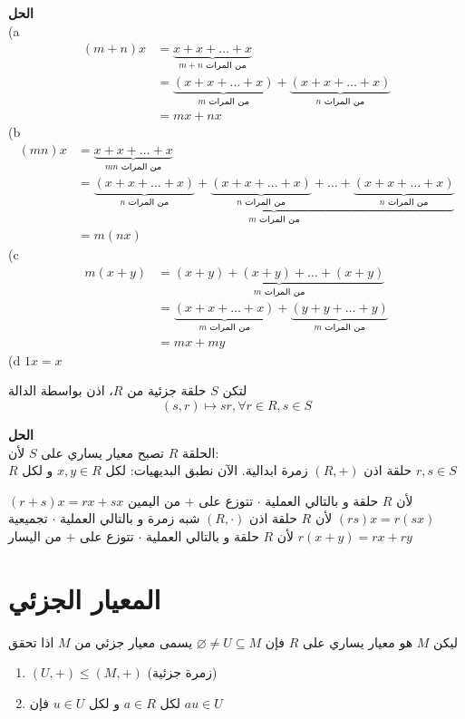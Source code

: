 \noindent
	\textbf{الحل}\\
	\noindent
	(a
	\begin{align*}
		(m+n) x &= \underbrace{x+x+\dots+x}_{\text{$m+n$ من المرات}}\\
		&= \underbrace{(x+x+\dots+x)}_{\text{$m$ من المرات}} +  \underbrace{(x+x+\dots+x)}_{\text{$n$ من المرات}} \\
		&= mx+nx
	\end{align*}
	(b
	\begin{align*}
		(mn)x &= \underbrace{x+x+\dots+x}_{\text{$mn$ من المرات}}\\
		&= \underbrace{
		\underbrace{(x+x+\dots+x)}_{\text{$n$ من المرات}} + \underbrace{(x+x+\dots+x)}_{\text{$n$ من المرات}} + \dots + \underbrace{(x+x+\dots+x)}_{\text{$n$ من المرات}}
		}_{\text{$m$ من المرات}}\\
		&= m(nx)
	\end{align*}
	(c
	\begin{align*}
		m(x+y) &= \underbrace{(x+y)+(x+y)+\dots+(x+y)}_{\text{$m$ من المرات}}\\
		&= \underbrace{(x+x+\dots+x)}_{\text{$m$ من المرات}} + \underbrace{(y+y+\dots+y)}_{\text{$m$ من المرات}} \\
		&= mx+ my
	\end{align*}
	(d $1x = x$
	\begin{example}
		لتكن $S$ حلقة جزئية من $R$، اذن بواسطة الدالة
		\[
		(s,r) \mapsto sr, \forall r\in R , s\in S
		\]
	\end{example}
	\noindent
	\textbf{الحل}\\
	\noindent
	الحلقة $R$ تصبح معيار يساري على $S$ لأن:\\
	 	$R$ حلقة اذن $(R,+)$ زمرة ابدالية. الآن نطبق البديهيات: لكل $x,y\in R$ و لكل $r,s\in S$
	\begin{tasks}
			\task $(r+s)x=rx+sx$ لأن $R$ حلقة و بالتالي العملية $\cdot$ تتوزع على $+$ من اليمين
		\task $(rs)x=r(sx)$ لأن $R$ حلقة اذن $(R,\cdot)$ شبه زمرة و بالتالي العملية $\cdot$ تجميعية
		\task $r(x+y) = rx+ry$ لأن $R$ حلقة و بالتالي العملية $\cdot$ تتوزع على $+$ من اليسار
	\end{tasks}

\section{المعيار الجزئي}
\begin{definition}
  ليكن $M$ هو معيار يساري على $R$ فإن $\varnothing\neq U\subseteq M$ يسمى معيار جزئي من $M$ اذا تحقق
  \begin{enumerate}
  	\item $(U, +) \leq (M, +)$ (زمرة جزئية)
  	\item  لكل $a\in R$ و لكل $u\in U$ فإن $au\in U$
  \end{enumerate}
\end{definition}

